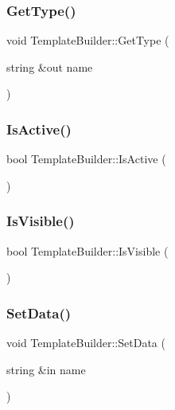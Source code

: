 \hypertarget{class_template_builder_a67bc9705aabf504327ddfc16c175bc85}{}\label{class_template_builder_a67bc9705aabf504327ddfc16c175bc85} 
\subsubsection{\texorpdfstring{Get\+Type()}{GetType()}}
{\footnotesize\ttfamily void Template\+Builder\+::\+Get\+Type (\begin{DoxyParamCaption}\item[{string \&out}]{name }\end{DoxyParamCaption})}

\hypertarget{class_template_builder_ac1b03aa33802b1471f30695a92801631}{}\label{class_template_builder_ac1b03aa33802b1471f30695a92801631} 
\subsubsection{\texorpdfstring{Is\+Active()}{IsActive()}}
{\footnotesize\ttfamily bool Template\+Builder\+::\+Is\+Active (\begin{DoxyParamCaption}{ }\end{DoxyParamCaption})}

\hypertarget{class_template_builder_a4dce883478f31bb85a99f770c50289e4}{}\label{class_template_builder_a4dce883478f31bb85a99f770c50289e4} 
\subsubsection{\texorpdfstring{Is\+Visible()}{IsVisible()}}
{\footnotesize\ttfamily bool Template\+Builder\+::\+Is\+Visible (\begin{DoxyParamCaption}{ }\end{DoxyParamCaption})}

\hypertarget{class_template_builder_a0cff5ae457e78989f061937237ae84d0}{}\label{class_template_builder_a0cff5ae457e78989f061937237ae84d0} 
\subsubsection{\texorpdfstring{Set\+Data()}{SetData()}}
{\footnotesize\ttfamily void Template\+Builder\+::\+Set\+Data (\begin{DoxyParamCaption}\item[{string \&in}]{name }\end{DoxyParamCaption})}

